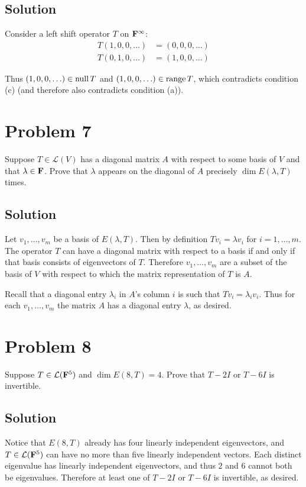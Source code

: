 \documentclass{article}
\begin{document}
\subsection*{Solution}
Consider a left shift operator $T$ on $\mathbf{F}^\infty$:
\begin{align*}
    T(1,0,0,\ldots)&=(0,0,0,\ldots)\\
    T(0,1,0,\ldots)&=(1,0,0,\ldots)
\end{align*}

Thus $(1,0,0,\ldots)\in\text{null}\, T$ and $(1,0,0,\ldots)\in\text{range}\, T$, which contradicts condition (c) (and therefore also contradicts condition (a)).

\section*{Problem 7}
Suppose $T\in\mathcal{L}(V)$ has a diagonal matrix $A$ with respect to some basis of $V$ and that $\lambda\in\mathbf{F}$. Prove that $\lambda$ appears on the diagonal of $A$ precisely $\dim E(\lambda, T)$ times.

\subsection*{Solution}
Let $v_1,\ldots,v_m$ be a basis of $E(\lambda, T)$. Then by definition $Tv_i=\lambda v_i$ for $i=1,\ldots,m$. The operator $T$ can have a diagonal matrix with respect to a basis if and only if that basis consists of eigenvectors of $T$. Therefore $v_1,\ldots,v_m$ are a subset of the basis of $V$ with respect to which the matrix representation of $T$ is $A$.

\vs

Recall that a diagonal entry $\lambda_i$ in $A$'s column $i$ is such that $Tv_i=\lambda_i v_i$. Thus for each $v_1,\ldots,v_m$ the matrix $A$ has a diagonal entry $\lambda$, as desired.

\section*{Problem 8}
Suppose $T\in\mathcal{L}(\mathbf{F}^5)$ and $\dim E(8,T)=4$. Prove that $T-2I$ or $T-6I$ is invertible.

\subsection*{Solution}
Notice that $E(8,T)$ already has four linearly independent eigenvectors, and $T\in\mathcal{L}(\mathbf{F}^5)$ can have no more than five linearly independent vectors. Each distinct eigenvalue has linearly independent eigenvectors, and thus $2$ and $6$ cannot both be eigenvalues. Therefore at least one of $T-2I$ or $T-6I$ is invertible, as desired.
\end{document}

